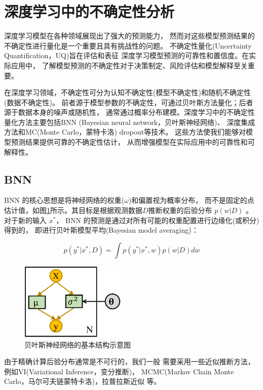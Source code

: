 \section{深度学习中的不确定性分析}\label{uncertainties}
深度学习模型在各种领域展现出了强大的预测能力，
然而对这些模型预测结果的不确定性进行量化是一个重要且具有挑战性的问题。
不确定性量化(Uncertainty Quantification，UQ)旨在评估和表征
深度学习模型预测的可靠性和置信度。在实际应用中，
了解模型预测的不确定性对于决策制定、风险评估和模型解释至关重要。

在深度学习领域，不确定性可分为认知不确定性(模型不确定性)和随机不确定性(数据不确定性)。\cite{ABDAR2021243}
前者源于模型参数的不确定性，可通过贝叶斯方法量化；后者源于数据本身的噪声或随机性，
通常通过概率分布建模。深度学习中的不确定性量化方法主要包括BNN
(Bayesian neural network，贝叶斯神经网络)、
深度集成方法\cite{NIPS2017_9ef2ed4b}和MC(Monte Carlo，蒙特卡洛) dropout等技术。
这些方法使我们能够对模型预测结果提供可靠的不确定性估计，
从而增强模型在实际应用中的可靠性和可解释性。

\subsection{BNN}
BNN 的核心思想是将神经网络的权重($\omega$)和偏置视为概率分布，
而不是固定的点估计值，如图\ref{bnn}所示。其目标是根据观测数据$D$推断权重的后验分布 $p(w|D)$ 。
对于新的输入 $x^*$，
BNN 的预测是通过对所有可能的权重配置进行边缘化(或积分)得到的，
即进行贝叶斯模型平均(Bayesian model averaging)：\cite{ABDAR2021243}

\begin{equation}
    p(y^*|x^*,D) = \int p(y^*|x^*,w)p(w|D)dw
\end{equation}

\begin{figure}[htbp]
    \centering
    \includegraphics[width=0.45\textwidth]{figures/Bayesianneuralnetwork.pdf}
    \caption{贝叶斯神经网络的基本结构示意图\cite{DBLP:journals/corr/abs-2011-06225}}
    \label{bnn}
\end{figure}
由于精确计算后验分布通常是不可行的，我们一般
需要采用一些近似推断方法，
例如VI(Variational Inference，变分推断)，
MCMC(Markov Chain Monte Carlo，马尔可夫链蒙特卡洛)，拉普拉斯近似
等。

